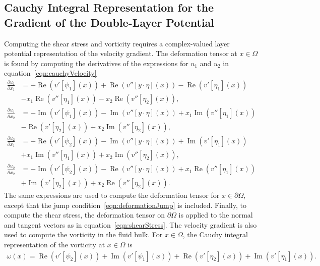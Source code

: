 \documentclass[preprint, superscriptaddress, notitlepage]{revtex4-1}
\newcommand{\Real}{\Re}
\newcommand{\Imag}{\Im}
\newcommand{\bd}{{\partial}}
\renewcommand{\Re}{{\operatorname{Re}}}
\renewcommand{\Im}{{\operatorname{Im}}}
\newcommand{\pderiv}[2]{\frac{\partial #1}{\partial #2}}
\begin{document}
\subsection{Cauchy Integral Representation for the Gradient of the
Double-Layer Potential}
\label{sec:gradDLPcomplex}
Computing the shear stress and vorticity requires a complex-valued layer
potential representation of the velocity gradient.  The deformation
tensor at $x \in \Omega$ is found by computing the derivatives of the
expressions for $u_1$ and $u_2$ in equation~\eqref{eqn:cauchyVelocity}  
\begin{equation}
\label{eqn:cauchyGradient}
  \begin{aligned}
    \pderiv{u_1}{x_1} &= +\Real (v'[\psi_1](x)) + 
    \Real (v''[y\cdot\eta](x)) - \Real (v'[\eta_1](x)) \\
    &- x_1\Real (v''[\eta_1](x)) - x_2\Real (v''[\eta_2](x)), \\
    \pderiv{u_1}{x_2} &= - \Imag (v'[\psi_1](x)) - 
    \Imag (v''[y\cdot\eta](x)) + x_1\Imag (v''[\eta_1](x)) \\
    &- \Real (v'[\eta_2](x)) + x_2\Imag (v''[\eta_2](x)), \\
    \pderiv{u_2}{x_1} &= +\Real (v'[\psi_2](x)) - 
    \Imag (v''[y\cdot\eta](x)) + \Imag (v'[\eta_1](x))  \\
    &+ x_1\Imag (v''[\eta_1](x)) + x_2\Imag (v''[\eta_2](x)), \\
    \pderiv{u_2}{x_2} &= -\Imag (v'[\psi_2](x)) - 
    \Real (v''[y\cdot\eta](x)) + x_1\Real (v''[\eta_1](x)) \\
    &+ \Imag (v'[\eta_2](x)) + x_2\Real (v''[\eta_2](x)).
  \end{aligned}
\end{equation}
The same expressions are used to compute the deformation tensor for $x
\in \bd\Omega$, except that the jump
condition~\eqref{eqn:deformationJump} is included.  Finally, to compute
the shear stress, the deformation tensor on $\bd\Omega$ is applied to
the normal and tangent vectors as in equation~\eqref{eqn:shearStress}.
The velocity gradient is also used to compute the vorticity in the fluid
bulk.  For $x \in \Omega$, the Cauchy integral representation of the
vorticity at $x \in \Omega$ is
\begin{align}
  \omega(x) = 
    \Real (v'[\psi_2](x)) + \Imag (v'[\psi_1](x))+ 
    \Real (v'[\eta_2](x))+ \Imag (v'[\eta_1](x)).
\end{align}
\end{document}
